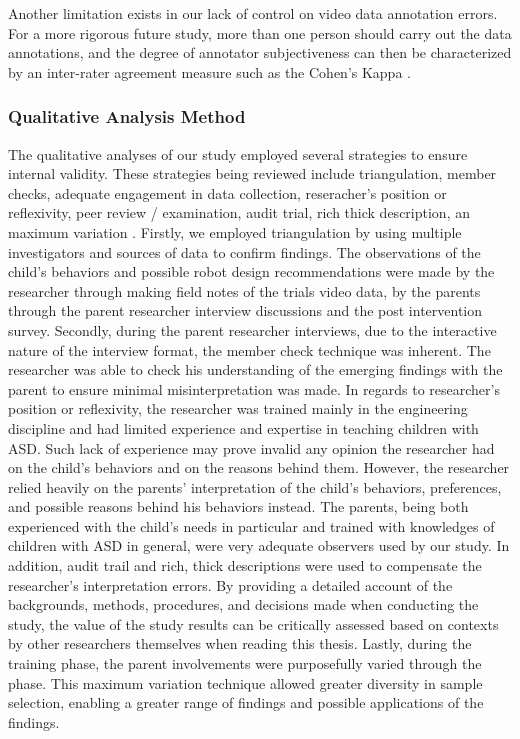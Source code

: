 Another limitation exists in our lack of control on video data annotation errors.  For a more rigorous future study, more than one person should carry out the data annotations, and the degree of annotator subjectiveness can then be characterized by an inter-rater agreement measure such as the Cohen's Kappa \cite{volkmar2005handbook}.

\subsubsection{Qualitative Analysis Method}
The qualitative analyses of our study employed several strategies to ensure internal validity.  These strategies being reviewed include triangulation, member checks, adequate engagement in data collection, reseracher's position or reflexivity, peer review / examination, audit trial, rich thick description, an maximum variation \cite{merriam2014qualitative}.  Firstly, we employed triangulation by using multiple investigators and sources of data to confirm findings.  The observations of the child's behaviors and possible robot design recommendations were made by the researcher through making field notes of the trials video data, by the parents through the parent researcher interview discussions and the post intervention survey.  Secondly, during the parent researcher interviews, due to the interactive nature of the interview format, the member check technique was inherent.  The researcher was able to check his understanding of the emerging findings with the parent to ensure minimal misinterpretation was made.  In regards to researcher's position or reflexivity, the researcher was trained mainly in the engineering discipline and had limited experience and expertise in teaching children with ASD.  Such lack of experience may prove invalid any opinion the researcher had on the child's behaviors and on the reasons behind them.  However, the researcher relied heavily on the parents' interpretation of the child's behaviors, preferences, and possible reasons behind his behaviors instead.  The parents, being both experienced with the child's needs in particular and trained with knowledges of children with ASD in general, were very adequate observers used by our study.  In addition, audit trail and rich, thick descriptions were used to compensate the researcher's interpretation errors.  By providing a detailed account of the backgrounds, methods, procedures, and decisions made when conducting the study, the value of the study results can be critically assessed based on contexts by other researchers themselves when reading this thesis.  Lastly, during the training phase, the parent involvements were purposefully varied through the phase.  This maximum variation technique allowed greater diversity in sample selection, enabling a greater range of findings and possible applications of the findings.

